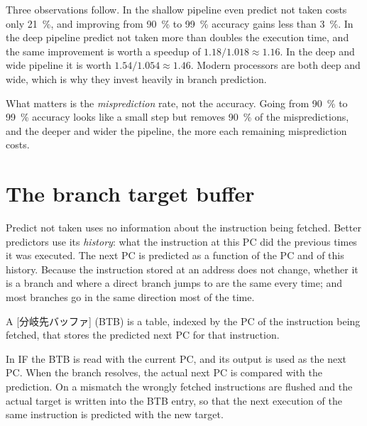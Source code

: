 \documentclass[../main.tex]{subfiles}
\begin{document}
Three observations follow.  In the shallow pipeline even predict not taken
costs only \SI{21}{\percent}, and improving from \SI{90}{\percent} to
\SI{99}{\percent} accuracy gains less than \SI{3}{\percent}.  In the deep
pipeline predict not taken more than doubles the execution time, and the
same improvement is worth a speedup of $1.18/1.018 \approx 1.16$.  In the deep
and wide pipeline it is worth $1.54/1.054 \approx 1.46$.  Modern processors
are both deep and wide, which is why they invest heavily in branch prediction.

\begin{keypoint}
  What matters is the \emph{misprediction} rate, not the accuracy.  Going
  from \SI{90}{\percent} to \SI{99}{\percent} accuracy looks like a small
  step but removes \SI{90}{\percent} of the mispredictions, and the deeper and
  wider the pipeline, the more each remaining misprediction costs.
\end{keypoint}

\section{The branch target buffer}
\label{sec:l04-btb}

Predict not taken uses no information about the instruction being fetched.
Better predictors use its \emph{history}: what the instruction at this PC did
the previous times it was executed.  The next PC is predicted as a function of the PC and
of this history.  Because the instruction stored at an address does not
change, whether it is a branch and where a direct branch jumps to are the
same every time; and most branches go in the same direction most of the time.

\begin{definition}
  A [分岐先バッファ]
  (BTB) is a table, indexed by the PC
  of the instruction being fetched, that stores the predicted next PC for
  that instruction.
\end{definition}

In IF the BTB is read with the current PC, and its output is used as the
next PC.  When the branch resolves, the actual next PC is compared with the
prediction.  On a mismatch the wrongly fetched instructions are flushed and
the actual target is written into the BTB entry, so that the next execution
of the same instruction is predicted with the new target.
\end{document}
